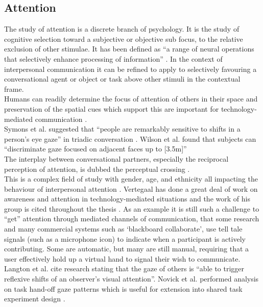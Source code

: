 \subsection{Attention}
The study of attention is a discrete branch of psychology. It is the study of cognitive selection toward a subjective or objective sub focus, to the relative exclusion of other stimulae. It has been defined as ``a range of neural operations that selectively enhance processing of information'' \cite{carlston2013oxford}. In the context of interpersonal communication it can be refined to apply to selectively favouring a conversational agent or object or task above other stimuli in the contextual frame.\\
Humans can readily determine the focus of attention of others in their space \cite{Stiefelhagen2001} and preservation of the spatial cues which support this are important for technology-mediated communication \cite{Sellen1992} \cite{Stiefelhagen2002}.\\
Symons et al. suggested that ``people are remarkably sensitive to shifts in a person's eye gaze'' in triadic conversation \cite{Symons2004}. Wilson et al. found that subjects can ``discriminate gaze focused on adjacent faces up to [3.5m]'' \cite{Wilson2000}\\
The interplay between conversational partners, especially the reciprocal perception of attention, is dubbed the perceptual crossing \cite{Deckers2013, Gibson1963}.\\
This is a complex field of study with gender, age, and ethnicity all impacting the behaviour of interpersonal attention \cite{Bente1998, Slessor2008, Argyle, Hofmann20061683, Pan2008a}.
Vertegaal has done a great deal of work on awareness and attention in technology-mediated situations and the work of his group is cited throughout the thesis \cite{Vertegaal1997}. As an example it is still such a challenge to ``get'' attention through mediated channels of communication, that some research \cite{Fels2000, Sellen1992} and many commercial systems such as `blackboard collaborate', use tell tale signals (such as a microphone icon) to indicate when a participant is actively contributing. Some are automatic, but many are still manual, requiring that a user effectively hold up a virtual hand to signal their wish to communicate.\\
Langton et al. cite research stating that the gaze of others is ``able to trigger reflexive shifts of an observer's visual attention''. Novick et al. performed analysis on task hand-off gaze patterns which is useful for extension into shared task experiment design \cite{Novick1996}.\\
